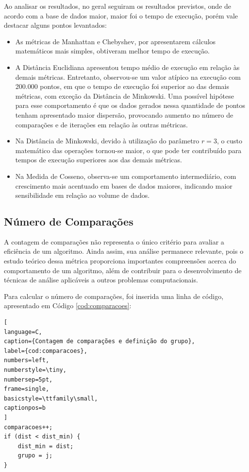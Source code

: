 \documentclass[10pt,a4paper,twocolumn]{article}
\begin{document}
Ao analisar os resultados, no geral seguiram os resultados previstos, onde de acordo com a base de dados maior, maior foi o tempo de execução, porém vale destacar alguns pontos levantados:
\begin{itemize}

\item As métricas de Manhattan e Chebyshev, por apresentarem cálculos matemáticos mais simples, obtiveram melhor tempo de execução.

\item A Distância Euclidiana apresentou tempo médio de execução em relação às demais métricas. Entretanto, observou-se um valor atípico na execução com 200.000 pontos, em que o tempo de execução foi superior ao das demais métricas, com exceção da Distância de Minkowski. Uma possível hipótese para esse comportamento é que os dados gerados nessa quantidade de pontos tenham apresentado maior dispersão, provocando aumento no número de comparações e de iterações em relação às outras métricas.

\item Na Distância de Minkowski, devido à utilização do parâmetro $r = 3$, o custo matemático das operações tornou-se maior, o que pode ter contribuído para tempos de execução superiores aos das demais métricas.

\item Na Medida de Cosseno, observa-se um comportamento intermediário, com crescimento mais acentuado em bases de dados maiores, indicando maior sensibilidade em relação ao volume de dados.

\end{itemize}


\subsection{Número de Comparações}
\label{subsec:nComparacoes}

A contagem de comparações não representa o único critério para avaliar a eficiência de um algoritmo. Ainda assim, sua análise permanece relevante, pois o estudo teórico dessa métrica proporciona importantes compreensões acerca do comportamento de um algoritmo, além de contribuir para o desenvolvimento de técnicas de análise aplicáveis a outros problemas computacionais\cite{Knuth1998}.

Para calcular o número de comparações, foi inserida uma linha de código, apresentado em Código \ref{cod:comparacoes}:

\begin{lstlisting}[
language=C,
caption={Contagem de comparações e definição do grupo},
label={cod:comparacoes},
numbers=left,
numberstyle=\tiny,
numbersep=5pt,
frame=single,
basicstyle=\ttfamily\small,
captionpos=b
]
comparacoes++;
if (dist < dist_min) {
    dist_min = dist;
    grupo = j;
}
\end{lstlisting}
\end{document}
